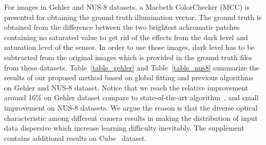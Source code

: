 \documentclass[10pt,twocolumn,letterpaper]{article}
\begin{document}
For images in Gehler and NUS-8 datasets, a Macbeth ColorChecker (MCC) is presented for obtaining the ground truth illumination vector.
The ground truth is obtained from the difference between the two  brightest achromatic patches
containing no saturated value to get rid of the effects from the dark level and saturation level of the sensor.
In order to use those images, dark level has to be subtracted from the original images which
is provided in the ground truth files from these datasets.
Table~\ref{table_gehler} and Table~\ref{table_nus8} summarize the results of
our proposed method based on global fitting and previous algorithms on Gehler and NUS-8 dataset.
Notice that we reach the relative improvement around 16\% on Gehler dataset compare to state-of-the-art algorithm~\cite{DBLP:journals/corr/BarronT16},
and small improvement on NUS-8 datasets.
We argue the reason is that the diverse optical characteristic among different camera
results in making the distribution of input data dispersive which increase learning difficulty inevitably.
The supplement contains additional results on Cube~\cite{DBLP:journals/corr/abs-1712-00436} dataset.
\end{document}

